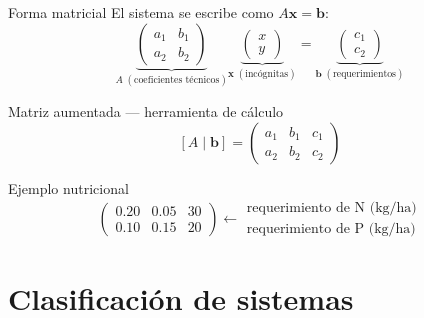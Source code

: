 \documentclass[11pt, aspectratio=169]{beamer}
\begin{document}
\begin{frame}{Forma matricial}
  El sistema se escribe como $A\mathbf{x} = \mathbf{b}$:
  \[
    \underbrace{\begin{pmatrix} a_1 & b_1 \\ a_2 & b_2 \end{pmatrix}}_{A\;(\text{coeficientes técnicos})}
    \underbrace{\begin{pmatrix} x \\ y \end{pmatrix}}_{\mathbf{x}\;(\text{incógnitas})}
    =
    \underbrace{\begin{pmatrix} c_1 \\ c_2 \end{pmatrix}}_{\mathbf{b}\;(\text{requerimientos})}
  \]

  \vspace{0.3em}
  \begin{block}{Matriz aumentada — herramienta de cálculo}
    \[
      [A \mid \mathbf{b}] =
      \left(\begin{array}{cc|c}
        a_1 & b_1 & c_1 \\
        a_2 & b_2 & c_2
      \end{array}\right)
    \]
  \end{block}

  \vspace{0.2em}
  \begin{exampleblock}{Ejemplo nutricional}
    \[
      \left(\begin{array}{cc|c}
        0.20 & 0.05 & 30 \\
        0.10 & 0.15 & 20
      \end{array}\right)
      \leftarrow
      \begin{array}{l}
        \text{requerimiento de N (kg/ha)}\\
        \text{requerimiento de P (kg/ha)}
      \end{array}
    \]
  \end{exampleblock}
\end{frame}

\section{Clasificación de sistemas}
\end{document}

